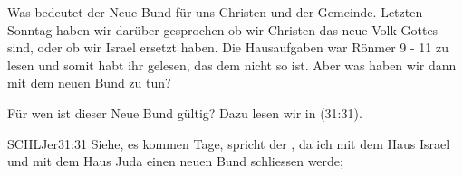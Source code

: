     \begin{otsblock}
        Was bedeutet der Neue Bund für uns Christen und der Gemeinde. Letzten Sonntag haben wir darüber gesprochen ob wir Christen das neue Volk Gottes sind, oder ob wir Israel ersetzt haben. Die Hausaufgaben war Rönmer 9 - 11 zu lesen und somit habt ihr gelesen, das dem nicht so ist. Aber was haben wir dann mit dem neuen Bund zu tun?

        Für wen ist dieser Neue Bund gültig? Dazu lesen wir in (31:31).
        \begin{bibelbox}{SCHL}{Jer}{31:31}
            Siehe, es kommen Tage, spricht der \herr{}, da ich mit dem Haus Israel und mit dem Haus Juda einen neuen Bund schliessen werde;
        \end{bibelbox}

    \end{otsblock}
